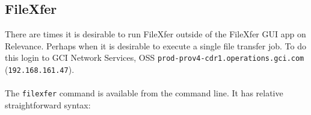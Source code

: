 
\subsection{FileXfer}

There are times it is desirable to run FileXfer outside of the
FileXfer GUI app on Relevance.  Perhaps when it is desirable to
execute a single file transfer job. To do this login to 
GCI Network Services, OSS \texttt{prod-prov4-cdr1.operations.gci.com}
(\texttt{192.168.161.47}).\\
\\
The \texttt{filexfer} command is available from the command line.
It has relative straightforward syntax:

